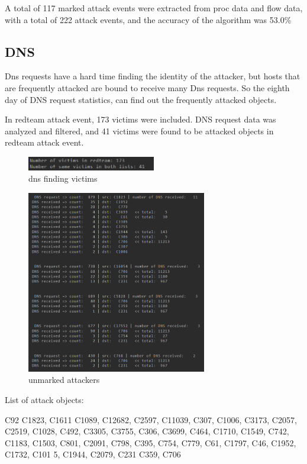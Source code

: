 \documentclass[12pt,journal,draftcls,doublespace, letterpaper,onecolumn]{IEEEtran}
\begin{document}
A total of 117 marked attack events were extracted from proc data and flow data, with a total of 222 attack events, and the accuracy of the algorithm was 53.0\%

\subsection{DNS}
Dns requests have a hard time finding the identity of the attacker, but hosts that are frequently attacked are bound to receive many Dns requests. So the eighth day of DNS request statistics, can find out the frequently attacked objects.

In redteam attack event, 173 victims were included. DNS request data was analyzed and filtered, and 41 victims were found to be attacked objects in redteam attack event.
\begin{figure}[htpb]
	\centering
	\includegraphics [width=0.5\textwidth]{11.png}
	\caption{dns finding victims}
	\label{fig}
\end{figure}

\begin{figure}[htpb]
	\centering
	\includegraphics [width=0.7\textwidth]{13.png}
	\caption{unmarked attackers}
	\label{fig}
\end{figure}



List of attack objects:

C92 C1823, C1611 C1089, C12682, C2597, C11039, C307, C1006, C3173, C2057, C2519, C1028, C492, C3305, C3755, C306, C3699, C464, C1710, C1549, C742, C1183, C1503, C801, C2091, C798, C395, C754, C779, C61, C1797, C46, C1952, C1732, C101 5, C1944, C2079, C231 C359, C706
\end{document}
